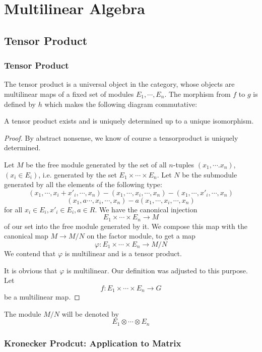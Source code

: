 \chapter{Multilinear Algebra}

\section{Tensor Product}
\subsection{Tensor Product}
The tensor product is a universal object in the category, whose objects are multilinear maps of a fixed set of modules $E_1,\cdots,E_n$. The morphism from $f$ to $g$ is defined by $h$ which makes the following diagram commutative: 
\par
\begin{theorem}
A tensor product exists and is uniquely determined up to a unique isomorphism.\
\end{theorem}
\begin{proof}
By abstract nonsense, we know of course a tensorproduct is uniquely determined. \par
Let $M$ be the free module generated by the set of all $n$-tuples $(x_1,\cdots.x_n)$,$(x_i\in E_i)$, i.e. generated by the set $E_1\times\cdots\times E_n$. Let $N$ be the submodule generated by all the elements of the following type:
\[(x_1,\cdots,x_i+x'_i,\cdots,x_n)-(x_1,\cdots,x_i,\cdots,x_n)-(x_1,\cdots,x'_i,\cdots,x_n)\]
\[(x_1,a\cdots,x_i,\cdots,x_n)-a(x_1,\cdots,x_i,\cdots,x_n)\]
for all $x_i\in E_i,x'_i\in E_i,a\in R$. We have the canonical injection \[E_1\times\cdots\times E_n\longrightarrow M\]of our set into the free module generated by it. We compose this map with the canonical map $M\longrightarrow M/N$ on the factor module, to get a map \[\varphi : E_1\times\cdots\times E_n\longrightarrow M/N\]
We contend that $\varphi$ is multilinear and is a tensor product.\par
It is obvious that $\varphi$ is multilinear. Our definition was adjusted to this purpose. Let \[f:E_1\times\cdots\times E_n\longrightarrow G\] be a multilinear map. 
\end{proof}
The module $M/N$ will be denoted by \[E_1\otimes\cdots\otimes E_n\]


\subsection{Kronecker Prodcut: Application to Matrix}
\begin{definition}

\end{definition}

